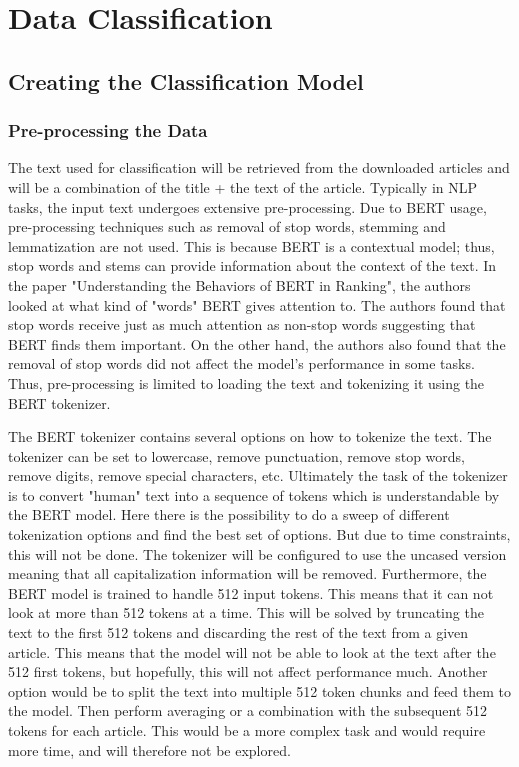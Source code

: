 \section{Data Classification}
\subsection{Creating the Classification Model}
\subsubsection{Pre-processing the Data}
The text used for classification will be retrieved from the downloaded articles and will be a combination of the title + the text of the article. Typically in NLP tasks, the input text undergoes extensive pre-processing. Due to BERT usage, pre-processing techniques such as removal of stop words, stemming and lemmatization are not used. This is because BERT is a contextual model; thus, stop words and stems can provide information about the context of the text. In the paper "Understanding the Behaviors of BERT in Ranking"\cite{qiao2019understanding}, the authors looked at what kind of "words" BERT gives attention to. The authors found that stop words receive just as much attention as non-stop words suggesting that BERT finds them important. On the other hand, the authors also found that the removal of stop words did not affect the model's performance in some tasks. Thus, pre-processing is limited to loading the text and tokenizing it using the BERT tokenizer. 

The BERT tokenizer contains several options on how to tokenize the text. The tokenizer can be set to lowercase, remove punctuation, remove stop words, remove digits, remove special characters, etc. Ultimately the task of the tokenizer is to convert "human" text into a sequence of tokens which is understandable by the BERT model. Here there is the possibility to do a sweep of different tokenization options and find the best set of options. But due to time constraints, this will not be done. The tokenizer will be configured to use the uncased version meaning that all capitalization information will be removed. Furthermore, the BERT model is trained to handle 512 input tokens. This means that it can not look at more than 512 tokens at a time. This will be solved by truncating the text to the first 512 tokens and discarding the rest of the text from a given article. This means that the model will not be able to look at the text after the 512 first tokens, but hopefully, this will not affect performance much. Another option would be to split the text into multiple 512 token chunks and feed them to the model. Then perform averaging or a combination with the subsequent 512 tokens for each article. This would be a more complex task and would require more time, and will therefore not be explored. 

